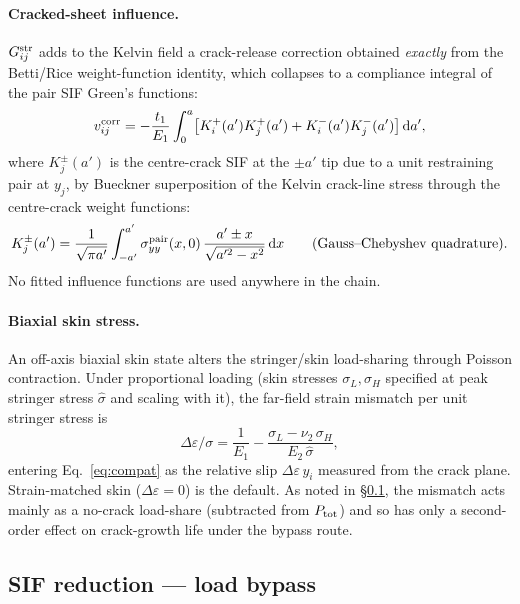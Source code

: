 \documentclass[11pt]{article}
\begin{document}
\paragraph{Cracked-sheet influence.} $G^{\rm str}_{ij}$ adds to the Kelvin
field a crack-release correction obtained \emph{exactly} from the
Betti/Rice weight-function identity, which collapses to a compliance
integral of the pair SIF Green's functions:
\begin{equation}
  v^{\rm corr}_{ij}
  = -\frac{t_1}{E_1}\int_0^{a}
     \bigl[K^+_i(a')K^+_j(a')+K^-_i(a')K^-_j(a')\bigr]\,\mathrm{d}a' ,
  \label{eq:betti}
\end{equation}
where $K^{\pm}_j(a')$ is the centre-crack SIF at the $\pm a'$ tip due to a
unit restraining pair at $y_j$, by Bueckner superposition of the Kelvin
crack-line stress through the centre-crack weight functions:
\begin{equation}
  K^{\pm}_j(a')=\frac{1}{\sqrt{\pi a'}}\int_{-a'}^{a'}
  \sigma^{\rm pair}_{yy}(x,0)\,\frac{a'\pm x}{\sqrt{a'^2-x^2}}\,\mathrm{d}x
  \qquad\text{(Gauss--Chebyshev quadrature).}
\end{equation}
No fitted influence functions are used anywhere in the chain.

\paragraph{Biaxial skin stress.} An off-axis biaxial skin state alters the
stringer/skin load-sharing through Poisson contraction. Under proportional
loading (skin stresses $\sigma_L,\sigma_H$ specified at peak stringer stress
$\hat\sigma$ and scaling with it), the far-field strain mismatch per unit
stringer stress is
\begin{equation}
  \Delta\varepsilon/\sigma=\frac1{E_1}
  -\frac{\sigma_L-\nu_2\,\sigma_H}{E_2\,\hat\sigma},
\end{equation}
entering Eq.~\eqref{eq:compat} as the relative slip $\Delta\varepsilon\,y_i$
measured from the crack plane. Strain-matched skin ($\Delta\varepsilon=0$) is
the default. As noted in \S\ref{sec:bypass}, the mismatch acts mainly as a
no-crack load-share (subtracted from $P_{\rm tot}$) and so has only a
second-order effect on crack-growth life under the bypass route.

\subsection{SIF reduction --- load bypass}
\label{sec:bypass}
\end{document}
